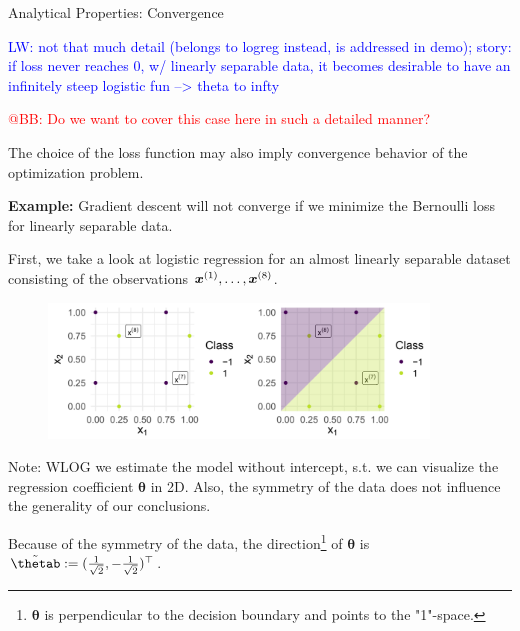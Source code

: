 \begin{vbframe}{Analytical Properties: Convergence}

\textcolor{blue}{LW: not that much detail (belongs to logreg instead, is addressed in demo); story: if loss never reaches 0, w/ linearly separable data, it becomes desirable to have an infinitely steep logistic fun --> theta to infty}

\textcolor{red}{@BB: Do we want to cover this case here in such a detailed manner? }

The choice of the loss function may also imply convergence behavior of the optimization problem. 

\vspace*{0.2cm}

\textbf{Example: } Gradient descent will not converge if we minimize the Bernoulli loss for linearly separable data. 

\vspace*{0.2cm}

First, we take a look at logistic regression for an almost linearly separable dataset consisting of the observations $\bm{x}^{(1)}, \dots, \bm{x}^{(8)}$.
\vfill

\begin{figure}
\includegraphics[width=0.9\textwidth]{figure_man/undet-problem01.png}\\
\end{figure}


Note: WLOG we estimate the
model without intercept, s.t. we can visualize the regression coefficient 
$\bm{\theta}$ in 2D. Also, the symmetry of the data does not influence the generality of our conclusions.

\vspace*{0.2cm}

Because of the symmetry of the data, the direction\footnote[frame]{$\bm{\theta}$ is perpendicular to the decision boundary and points to the "1"-space.} of $\bm{\theta}$ is $\tilde\thetab := (\frac{1}{\sqrt{2}}, -\frac{1}{\sqrt{2}})^\top$.

\medskip


\end{vbframe}
